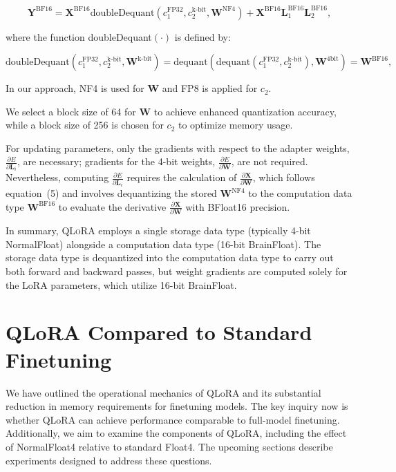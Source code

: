 \begin{equation}
    \mathbf{Y}^{\text{BF16}} =  \mathbf{X}^{\text{BF16}} \text{doubleDequant}(c_1^{\text{FP32}}, c_2^{\text{k-bit}}, \mathbf{W}^{\text{NF4}}) + \mathbf{X}^{\text{BF16}}\mathbf{L}^{\text{BF16}}_1\mathbf{L}^{\text{BF16}}_2,
\end{equation}

where the function doubleDequant$(\cdot)$ is defined by:

\begin{equation}
    \text{doubleDequant}(c_1^{\text{FP32}}, c_2^{\text{k-bit}}, \mathbf{W}^{\text{k-bit}}) = \text{dequant}(\text{dequant}(c_1^{\text{FP32}}, c_2^{\text{k-bit}}), \mathbf{W}^{\text{4bit}}) = \mathbf{W}^{\text{BF16}},
\end{equation}

In our approach, NF4 is used for $\mathbf{W}$ and FP8 is applied for $c_2$.

We select a block size of 64 for $\mathbf{W}$ to achieve enhanced quantization accuracy, while a block size of 256 is chosen for $c_2$ to optimize memory usage.

For updating parameters, only the gradients with respect to the adapter weights, $\frac{\partial E}{\partial \mathbf{L}_i}$, are necessary; gradients for the 4-bit weights, $\frac{\partial E}{\partial \mathbf{W}}$, are not required. Nevertheless, computing $\frac{\partial E}{\partial \mathbf{L}_i}$ requires the calculation of $\frac{\partial \mathbf{X}}{\partial \mathbf{W}}$, which follows equation~(5) and involves dequantizing the stored $\mathbf{W}^{\text{NF4}}$ to the computation data type $\mathbf{W}^{\text{BF16}}$ to evaluate the derivative $\frac{\partial \mathbf{X}}{\partial \mathbf{W}}$ with BFloat16 precision.

In summary, \textsc{QLoRA} employs a single storage data type (typically 4-bit NormalFloat) alongside a computation data type (16-bit BrainFloat). The storage data type is dequantized into the computation data type to carry out both forward and backward passes, but weight gradients are computed solely for the LoRA parameters, which utilize 16-bit BrainFloat.

\section{QLoRA Compared to Standard Finetuning}
\label{sec:comp_to_std}

We have outlined the operational mechanics of QLoRA and its substantial reduction in memory requirements for finetuning models. The key inquiry now is whether QLoRA can achieve performance comparable to full-model finetuning. Additionally, we aim to examine the components of QLoRA, including the effect of NormalFloat4 relative to standard Float4. The upcoming sections describe experiments designed to address these questions.

